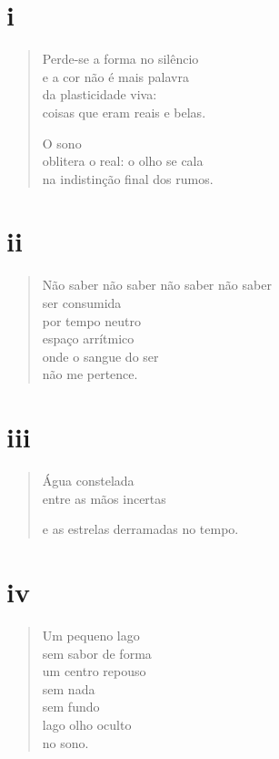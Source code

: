 \section{i}

\begin{verse}
Perde-se a forma no silêncio\\
e a cor não é mais palavra\\
da plasticidade viva:\\
coisas que eram reais e belas.

O sono\\
oblitera o real: o olho se cala\\
na indistinção final dos rumos.
\end{verse}

\medskip
\section{ii}

\begin{verse}
Não saber não saber não saber não saber\\
ser consumida\\
por tempo neutro\\
espaço arrítmico\\
onde o sangue do ser\\
não me pertence.
\end{verse}

\medskip
\section{iii}

\begin{verse}
Água constelada\\
entre as mãos incertas

e as estrelas derramadas no tempo.
\end{verse}

\medskip
\section{iv}

\begin{verse}
Um pequeno lago\\
sem sabor de forma\\
um centro repouso\\
sem nada\\
sem fundo\\
lago olho oculto\\
no sono.
\end{verse}

